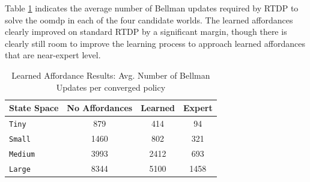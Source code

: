 \documentclass[letterpaper]{article}
\begin{document}
\begin{table}
\centering

\caption{Expert Affordance Results: Avg. Number of Bellman Updates per converged policy. Where SG refers to the subgoal planner, and the ``A-" prefix indicates the use of an affordance-aware planner.}
\label{table:hard-results}
\end{table}

Table \ref{table:learned-results} indicates the average number of Bellman updates required by RTDP to solve the \gls{oomdp}
in each of the four candidate worlds. The learned affordances clearly improved on standard RTDP by a significant margin, though
there is clearly still room to improve the learning process to approach learned affordances that are near-expert level.
\begin{table}
\centering
\begin{tabular}{ l || c c c }
  State Space & No Affordances & Learned & Expert  \\ \hline
  \texttt{Tiny}  		& 	879		&	414	&	 94	\\
  \texttt{Small}  	& 	1460		&	802	&	321  \\
  \texttt{Medium}  	& 	3993		&	2412	&	693  \\
  \texttt{Large}  	& 	8344		&	5100	&	1458
\end{tabular}
\caption{Learned Affordance Results: Avg. Number of Bellman Updates per converged policy}
\label{table:learned-results}
\end{table}
\end{document}
